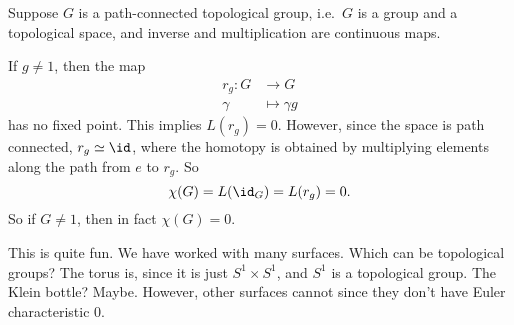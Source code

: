 \documentclass[a4paper]{article}
\begin{document}
\begin{eg}
  Suppose $G$ is a path-connected topological group, i.e.\ $G$ is a group and a topological space, and inverse and multiplication are continuous maps.

  If $g \not= 1$, then the map
  \begin{align*}
    r_g: G &\to G\\
    \gamma &\mapsto \gamma g
  \end{align*}
  has no fixed point. This implies $L(r_g) = 0$. However, since the space is path connected, $r_g \simeq \id$, where the homotopy is obtained by multiplying elements along the path from $e$ to $r_g$. So
  \[
    \chi(G) = L(\id_G) = L(r_g) = 0.
  \]
  So if $G \not= 1$, then in fact $\chi(G) = 0$.
\end{eg}
This is quite fun. We have worked with many surfaces. Which can be topological groups? The torus is, since it is just $S^1 \times S^1$, and $S^1$ is a topological group. The Klein bottle? Maybe. However, other surfaces cannot since they don't have Euler characteristic $0$.
\end{document}
